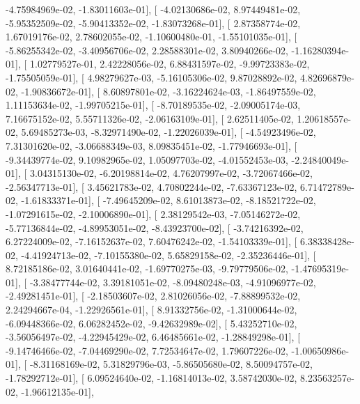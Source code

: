 \documentclass{article}
\begin{document}
         -4.75984969e-02,  -1.83011603e-01],
       [ -4.02130686e-02,   8.97449481e-02,  -5.95352509e-02,
         -5.90413352e-02,  -1.83073268e-01],
       [  2.87358774e-02,   1.67019176e-02,   2.78602055e-02,
         -1.10600480e-01,  -1.55101035e-01],
       [ -5.86255342e-02,  -3.40956706e-02,   2.28588301e-02,
          3.80940266e-02,  -1.16280394e-01],
       [  1.02779527e-01,   2.42228056e-02,   6.88431597e-02,
         -9.99723383e-02,  -1.75505059e-01],
       [  4.98279627e-03,  -5.16105306e-02,   9.87028892e-02,
          4.82696879e-02,  -1.90836672e-01],
       [  8.60897801e-02,  -3.16224624e-03,  -1.86497559e-02,
          1.11153634e-02,  -1.99705215e-01],
       [ -8.70189535e-02,  -2.09005174e-03,   7.16675152e-02,
          5.55711326e-02,  -2.06163109e-01],
       [  2.62511405e-02,   1.20618557e-02,   5.69485273e-03,
         -8.32971490e-02,  -1.22026039e-01],
       [ -4.54923496e-02,   7.31301620e-02,  -3.06688349e-03,
          8.09835451e-02,  -1.77946693e-01],
       [ -9.34439774e-02,   9.10982965e-02,   1.05097703e-02,
         -4.01552453e-03,  -2.24840049e-01],
       [  3.04315130e-02,  -6.20198814e-02,   4.76207997e-02,
         -3.72067466e-02,  -2.56347713e-01],
       [  3.45621783e-02,   4.70802244e-02,  -7.63367123e-02,
          6.71472789e-02,  -1.61833371e-01],
       [ -7.49645209e-02,   8.61013873e-02,  -8.18521722e-02,
         -1.07291615e-02,  -2.10006890e-01],
       [  2.38129542e-03,  -7.05146272e-02,  -5.77136844e-02,
         -4.89953051e-02,  -8.43923700e-02],
       [ -3.74216392e-02,   6.27224009e-02,  -7.16152637e-02,
          7.60476242e-02,  -1.54103339e-01],
       [  6.38338428e-02,  -4.41924713e-02,  -7.10155380e-02,
          5.65829158e-02,  -2.35236446e-01],
       [  8.72185186e-02,   3.01640441e-02,  -1.69770275e-03,
         -9.79779506e-02,  -1.47695319e-01],
       [ -3.38477744e-02,   3.39181051e-02,  -8.09480248e-03,
         -4.91096977e-02,  -2.49281451e-01],
       [ -2.18503607e-02,   2.81026056e-02,  -7.88899532e-02,
          2.24294667e-04,  -1.22926561e-01],
       [  8.91332756e-02,  -1.31000644e-02,  -6.09448366e-02,
          6.06282452e-02,  -9.42632989e-02],
       [  5.43252710e-02,  -3.56056497e-02,  -4.22945429e-02,
          6.46485661e-02,  -1.28849298e-01],
       [ -9.14746466e-02,  -7.04469290e-02,   7.72534647e-02,
          1.79607226e-02,  -1.00650986e-01],
       [ -8.31168169e-02,   5.31829796e-03,  -5.86505680e-02,
          8.50094757e-02,  -1.78292712e-01],
       [  6.09524640e-02,  -1.16814013e-02,   3.58742030e-02,
          8.23563257e-02,  -1.96612135e-01],
\end{document}
